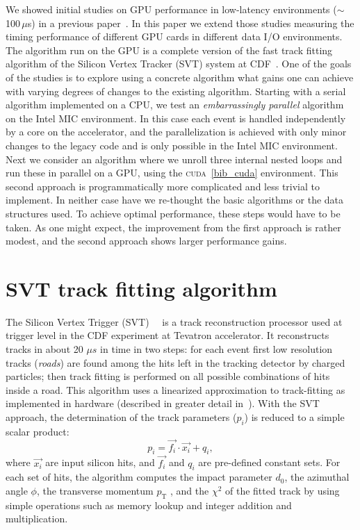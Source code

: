 \documentclass[letterpaper]{jpconf}
\begin{document}
We showed initial studies on GPU performance in low-latency
environments ($\sim$100\,$\mu$s) in a previous paper~\cite{bib_tipp2011,bib_nss2012}.  In this paper we extend those studies measuring the
timing performance of different GPU cards in different data I/O
environments. The algorithm run on the GPU is a complete version of
the fast track fitting algorithm of the Silicon Vertex Tracker (SVT)
system at CDF~\cite{bib_SVT1}. 
One of the goals of the studies is to explore using a concrete
algorithm what gains one can achieve with varying degrees of changes
to the existing algorithm. Starting with a serial algorithm
implemented on a CPU, we test an \textit{embarrassingly parallel} algorithm
on the Intel MIC environment. In this case each event is handled
independently by a core on the accelerator, and the parallelization is
achieved with only minor changes to the legacy code and is only
possible in the Intel MIC environment. Next we consider an algorithm
where we unroll three internal nested loops and run these in parallel
on a GPU, using the \textsc{cuda}~\ref{bib_cuda} environment. This second 
approach is programmatically more complicated and less trivial to implement. In
neither case have we re-thought the basic algorithms or the data
structures used. To achieve optimal performance, these steps would
have to be taken.  As one might expect, the improvement from the first
approach is rather modest, and the second approach shows larger
performance gains.

\section{SVT track fitting algorithm}
The Silicon Vertex Trigger (SVT)~\cite{bib_SVT1}~\cite{bib_SVT2} is a 
track reconstruction processor used at 
trigger level in the CDF experiment at Tevatron accelerator. It reconstructs 
tracks in about 20 $\mu s$ in time in two steps: for each event 
first low resolution tracks (\textit{roads}) are found among the hits left 
in the tracking detector by charged particles; then track fitting is 
performed on all possible combinations of hits inside a road. 
This algorithm uses a linearized approximation to track-fitting as 
implemented in hardware (described in greater detail in~\cite{bib_SVT3}). 
With the SVT approach, the determination of the track parameters 
($p_i$) is reduced to a simple scalar product:
\[
p_i = \vec{f_i} \cdot \vec{x_i} + q_i,
\]
where $\vec{x_i}$ are input silicon hits, and $\vec{f_i}$ and $q_i$ are 
pre-defined constant sets. For each set of hits, the algorithm
computes the impact parameter $d_0$, the azimuthal angle $\phi$, 
the transverse momentum $p_\mathrm{T}$ , and the $\chi^2$ of the
fitted track by using simple operations such as memory lookup and 
integer addition and multiplication.
\end{document}
